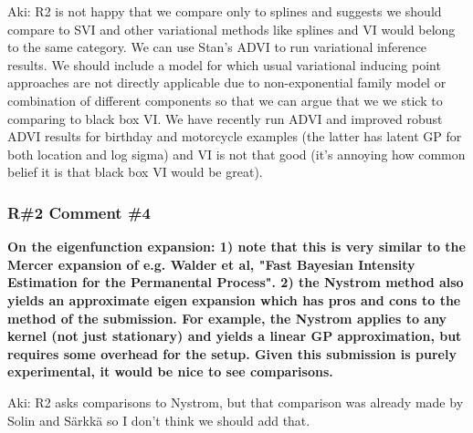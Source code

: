 \documentclass[11pt]{report}
\begin{document}
Aki: R2 is not happy that we compare only to splines and suggests we should compare to SVI and other variational methods like splines and VI would belong to the same category. We can use Stan's ADVI to run variational inference results. We should include a model for which usual variational inducing point approaches are not directly applicable due to non-exponential family model or combination of different components so that we can argue that we we stick to comparing to black box VI. We have recently run ADVI and improved robust ADVI results for birthday and motorcycle examples (the latter has latent GP for both location and log sigma)
and VI is not that good (it's annoying how common belief it is that black box
VI would be great).

\subsubsection*{R\#2 Comment \#4}

\textbf{On the eigenfunction expansion: 1) note that this is very similar to the Mercer expansion of e.g. Walder et al, "Fast Bayesian Intensity Estimation for the Permanental Process". 2) the Nystrom method also yields an approximate eigen expansion which has pros and cons to the method of the submission. For example, the Nystrom applies to any kernel (not just stationary) and yields a linear GP approximation, but requires some overhead for the setup. Given this submission is purely experimental, it would be nice to see comparisons.} 

Aki: R2 asks comparisons to Nystrom, but that comparison was
already made by Solin and Särkkä so I don't think we should add that.



\end{document}
